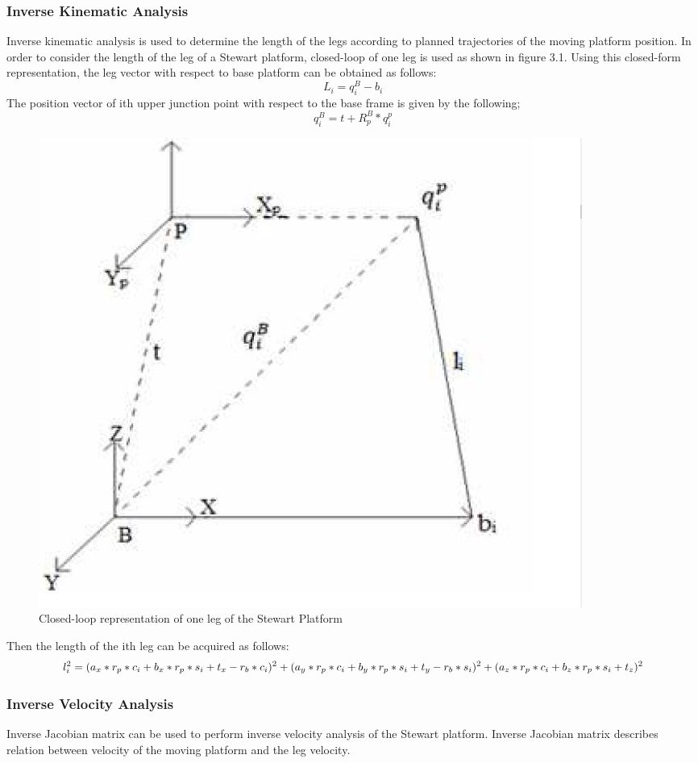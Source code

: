 \subsubsection{Inverse Kinematic Analysis}
Inverse kinematic analysis is used to determine the length of the legs according to planned trajectories of the moving platform position. In order to consider the length of the leg of a Stewart platform, closed-loop of one leg is used as shown in figure 3.1. Using this closed-form representation, the leg
vector with respect to base platform can be obtained as follows:
\begin{equation}
\label{eqn}
L_{i} = q_{i}^{B} - b_{i}
\end{equation}
The position vector of ith upper junction point with respect to the base frame is given by the following;
\begin{equation}
\label{eqn}
q_{i}^{B} = t + R_{p}^{B} * q_{i}^{p}
\end{equation}
\begin{center}
	\begin{figure}[!h]
	\centering
	\includegraphics[width=0.6\linewidth]{Figures/Fig12}
	\caption[Closed-loop representation]{Closed-loop representation of one leg of the Stewart Platform}
	\end{figure}
\end{center}
Then the length of the ith leg can be acquired as follows:
\begin{equation}
\label{eqn}
l_{i}^2 = (a_{x} * r_{p} * c_{i} + b_{x}*r_{p}*s_{i} + t_{x}-r_{b}*c_{i})^2 \\+ (a_{y}*r_{p}*c_{i} + b_{y}*r_{p}*s_{i} + t_{y}-r_{b}*s_{i})^2 \\+ (a_{z}*r_{p}*c_{i}+b_{z}*r_{p}*s_{i}+t_{z})^2
\end{equation}
\subsubsection{Inverse Velocity Analysis}
Inverse Jacobian matrix can be used to perform inverse velocity analysis of the Stewart
platform. Inverse Jacobian matrix describes relation between velocity of the moving platform and the leg velocity.

